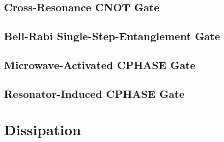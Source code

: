 \subsection{Cross-Resonance CNOT Gate}
\cite{ChowPRL2011}

\subsection{Bell-Rabi Single-Step-Entanglement Gate}
\cite{PolettoPRL2012}

\subsection{Microwave-Activated CPHASE Gate}
\cite{ChowNJP2013}

\subsection{Resonator-Induced CPHASE Gate}

\section{Dissipation}
